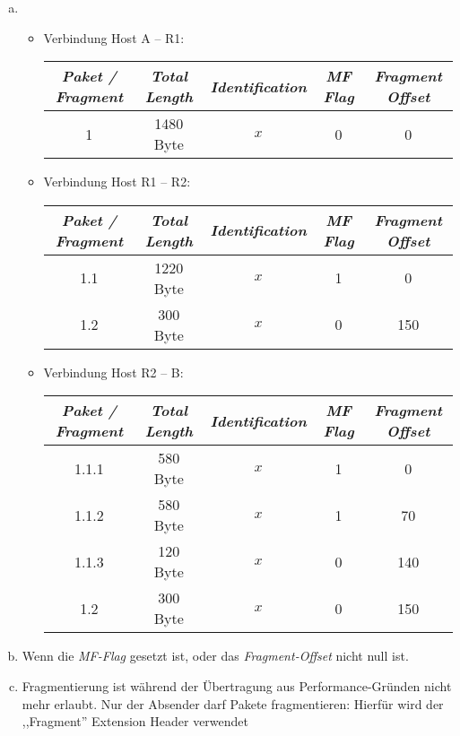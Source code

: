 \begin{enumerate}[a)]
	\item \begin{itemize}
		\item Verbindung Host A – R1:
		
		\begin{tabular}{c|c|c|c|c}
		\textit{Paket / Fragment} & \textit{Total Length} & \textit{Identification} & \textit{MF Flag} & \textit{Fragment Offset} \\ \hline
		1 & 1480 Byte & $x$ & 0 & 0 
		\end{tabular}	
		
		
		\item Verbindung Host R1 – R2:
		
		\begin{tabular}{c|c|c|c|c}
		\textit{Paket / Fragment} & \textit{Total Length} & \textit{Identification} & \textit{MF Flag} & \textit{Fragment Offset} \\ \hline
		1.1 & 1220 Byte & $x$ & 1 & 0 \\
		1.2 &  300 Byte & $x$ & 0 & 150 
		\end{tabular}
		
		\item Verbindung Host R2 – B:
		
		\begin{tabular}{c|c|c|c|c}
		\textit{Paket / Fragment} & \textit{Total Length} & \textit{Identification} & \textit{MF Flag} & \textit{Fragment Offset} \\ \hline
		1.1.1 & 580 Byte & $x$ & 1 & 0 \\
		1.1.2 & 580 Byte & $x$ & 1 & 70 \\
		1.1.3 & 120 Byte & $x$ & 0 & 140 \\
		1.2   & 300 Byte & $x$ & 0 & 150 
		
		\end{tabular}	
	
	\end{itemize}
	
	\item Wenn die \textit{MF-Flag} gesetzt ist, oder das \textit{Fragment-Offset} nicht null ist.
	\item Fragmentierung ist während der Übertragung aus Performance-Gründen nicht mehr erlaubt. Nur der Absender darf Pakete fragmentieren: Hierfür wird der ,,Fragment'' Extension Header verwendet
\end{enumerate}



